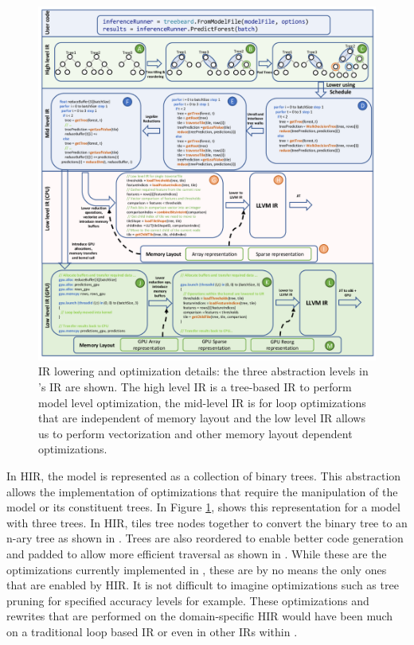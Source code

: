 \begin{figure}[htb]
  \centering
  \includegraphics[width=\linewidth]{figures/OverviewExample_New.png}
  \vskip 10pt
  \caption{\Treebeard{} IR lowering and optimization details: the three abstraction levels in \Treebeard{}'s IR are shown. The
           high level IR is a tree-based IR to perform model level optimization, the mid-level IR is for
           loop optimizations that are independent of memory layout and the low level IR allows us to perform
           vectorization and other memory layout dependent optimizations.}
  \label{Fig:LoweringExample}
\end{figure}

In HIR, the model is represented as a collection of binary trees. This abstraction
allows the implementation of optimizations that require the manipulation of the model
or its constituent trees. In Figure \ref{Fig:LoweringExample}, 
shows this representation for a model with three trees. 
In HIR, \Treebeard{} tiles tree nodes together to convert
the binary tree to an n-ary tree as shown in . Trees are also 
reordered to enable better code generation and padded to allow more 
efficient traversal as shown in . While these are the optimizations currently 
implemented in \Treebeard{}, these are by no means the only ones that 
are enabled by HIR. It is not difficult to imagine optimizations 
such as tree pruning for specified accuracy levels for example.
These optimizations and rewrites that are performed on the domain-specific 
HIR would have been much on a traditional loop based IR or even in 
other IRs within \Treebeard{}.


